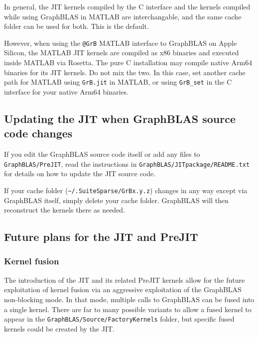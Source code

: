 \documentclass[12pt]{article}
\begin{document}
In general, the JIT kernels compiled by the C interface and the kernels
compiled while using GraphBLAS in MATLAB are interchangable, and the same cache
folder can be used for both.  This is the default.

However, when using the \verb'@GrB' MATLAB interface to GraphBLAS on Apple
Silicon, the MATLAB JIT kernels are compiled as x86 binaries and executed
inside MATLAB via Rosetta.  The pure C installation may compile native Arm64
binaries for its JIT kernels.  Do not mix the two.  In this case, set another
cache path for MATLAB using \verb'GrB.jit' in MATLAB, or using \verb'GrB_set'
in the C interface for your native Arm64 binaries.

\subsection{Updating the JIT when GraphBLAS source code changes}

If you edit the GraphBLAS source code itself or add any files to
\verb'GraphBLAS/PreJIT', read the instructions in
\verb'GraphBLAS/JITpackage/README.txt' for details on how to update the JIT
source code.

If your cache folder (\verb'~/.SuiteSparse/GrBx.y.z') changes in any way
except via GraphBLAS itself, simply delete your cache folder.  GraphBLAS will
then reconstruct the kernels there as needed.

\subsection{Future plans for the {\sf JIT} and {\sf PreJIT}}
\label{jit_future}

\subsubsection{Kernel fusion}
The introduction of the JIT and its related PreJIT kernels allow for the future
exploitation of kernel fusion via an aggressive exploitation of the GraphBLAS
non-blocking mode.  In that mode, multiple calls to GraphBLAS can be fused into
a single kernel.  There are far to many possible variants to allow a fused
kernel to appear in the \verb'GraphBLAS/Source/FactoryKernels' folder, but
specific fused kernels could be created by the JIT.
\end{document}
